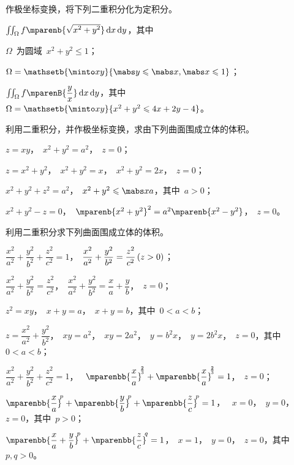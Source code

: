 \begin{exercise}
\item 作极坐标变换，将下列二重积分化为定积分。
\begin{exlist}
  \item $\iint_\Omega f\txts\mparenb{\smbsqrt{x^2+y^2}}\dif x\dif y$，其中
  \begin{exlistcols}[label=\Ding*]
    \item $\Omega$~为圆域~$x^2+y^2\leq1$；
    \item $\Omega=\mathsetb{\minto xy}{\mabs y\leq\mabs x,\mabs x\leq 1}$；
  \end{exlistcols}
  \item $\iint_\Omega f\mparenB{\dfrac yx}\dif x\dif y$，其中~$\Omega=\mathsetb{\minto xy}{x^2+y^2\leq 4x+2y-4}$。
\end{exlist}
\item 利用二重积分，并作极坐标变换，求由下列曲面围成立体的体积。
\begin{exlist}
  \item $z=xy$，~$x^2+y^2=a^2$，~$z=0$；
  \item $z=x^2+y^2$，~$x^2+y^2=x$，~$x^2+y^2=2x$，~$z=0$；
  \item $x^2+y^2+z^2=a^2$，~$x^2+y^2\leq\mabs x a$，其中~$a>0$；
  \item $x^2+y^2-z=0$，~$\mparenb{x^2+y^2}^2=a^2\mparenb{x^2-y^2}$，~$z=0$。
\end{exlist}
\item 利用二重积分求下列曲面围成立体的体积。
\begin{exlist}
  \item $\dfrac{x^2}{a^2}+\dfrac{y^2}{b^2}+\dfrac{z^2}{c^2}=1$，~$\dfrac{x^2}{a^2}+\dfrac{y^2}{b^2}=\dfrac{z^2}{c^2}\mcond{z>0}$；
  \item $\dfrac{x^2}{a^2}+\dfrac{y^2}{b^2}=\dfrac{z^2}{c^2}$，~$\dfrac{x^2}{a^2}+\dfrac{y^2}{b^2}=\dfrac xa+\dfrac yb$，~$z=0$；
  \item $z^2=xy$，~$x+y=a$，~$x+y=b$，其中~$0<a<b$；
  \item $z=\dfrac{x^2}{a^2}+\dfrac{y^2}{b^2}$，~$xy=a^2$，~$xy=2a^2$，~$y=b^2x$，~$y=2b^2x$，~$z=0$，其中~$0<a<b$；
  \item $\dfrac{x^2}{a^2}+\dfrac{y^2}{b^2}+\dfrac{z^2}{c^2}=1$，~
  $\mparenbb{\dfrac xa}^{\msp\frac23}+\mparenbb{\dfrac xa}^{\msp\frac23}=1$，~$z=0$；
  \item $\mparenbb{\dfrac xa}^{\msp p}+\mparenbb{\dfrac yb}^{\msp p}+\mparenbb{\dfrac zc}^{\msp p}=1$，%
  ~$x=0$，~$y=0$，~$z=0$，其中~$p>0$；
  \item $\mparenbb{\dfrac xa+\dfrac yb}^{\msp p}+\mparenbb{\dfrac zc}^{\msp q}=1$，~$x=1$，~$y=0$，~$z=0$，其中~$p,q>0$。

\end{exlist}
\end{exercise}
